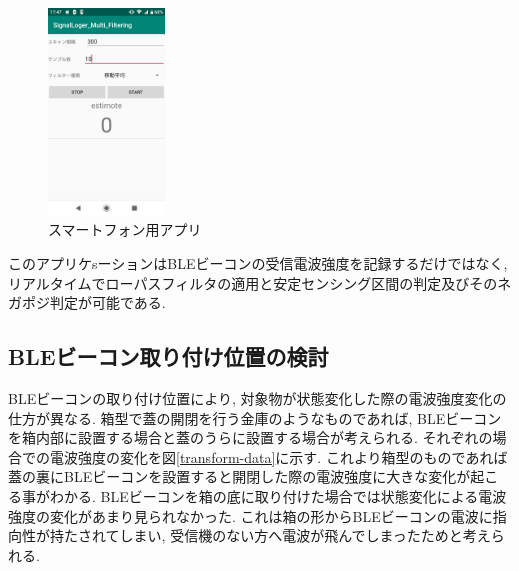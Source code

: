 \documentclass[Japanese]{dicomopapers}
\begin{document}
\begin{figure}[ht]
    \centering
    \includegraphics[height=5.5cm]{application.jpg}
    \caption{スマートフォン用アプリ}
    \label{phoneApp}
\end{figure}
このアプリケsーションはBLEビーコンの受信電波強度を記録するだけではなく, リアルタイムでローパスフィルタの適用と安定センシング区間の判定及びそのネガポジ判定が可能である.








\subsection{BLEビーコン取り付け位置の検討}
BLEビーコンの取り付け位置により, 対象物が状態変化した際の電波強度変化の仕方が異なる.
箱型で蓋の開閉を行う金庫のようなものであれば, BLEビーコンを箱内部に設置する場合と蓋のうらに設置する場合が考えられる.
それぞれの場合での電波強度の変化を図\ref{transform-data}に示す.
これより箱型のものであれば蓋の裏にBLEビーコンを設置すると開閉した際の電波強度に大きな変化が起こる事がわかる.
BLEビーコンを箱の底に取り付けた場合では状態変化による電波強度の変化があまり見られなかった.
これは箱の形からBLEビーコンの電波に指向性が持たされてしまい, 受信機のない方へ電波が飛んでしまったためと考えられる.
\end{document}

